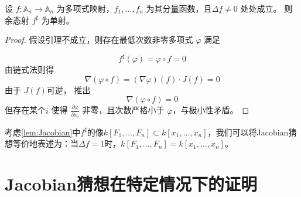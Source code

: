 \documentclass[12pt,a4paper]{ctexrep}   %
\begin{document}
\begin{lemma}
    \label{lem:Jacobian}
    设 $f: \mathbb{A}_n \to \mathbb{A}_n$ 为多项式映射，$f_1,\dots,f_n$ 为其分量函数，且$\Delta f\neq 0$   处处成立。
    则余态射 $f^\sharp$ 为单射。
\end{lemma}

\begin{proof}
    假设引理不成立，则存在最低次数非零多项式
    $\varphi$
    满足

    \begin{equation*}
        f^\sharp(\varphi)=\varphi\circ f=0
    \end{equation*}
    由链式法则得
    \begin{equation*}
        \nabla (\varphi\circ f)
        =
        (\nabla \varphi)(f)\cdot J(f)=0
    \end{equation*}
    由于 $J(f)$可逆，
    推出
    \begin{equation*}
        \nabla (\varphi\circ f)=0
    \end{equation*}
    但存在某个$i$ 使得 $\frac{\partial \varphi}{\partial x_i}$ 非零，且次数严格小于 $\varphi$，与极小性矛盾。
\end{proof}
考虑\ref{lem:Jacobian}中$f^{\sharp}$的像$k[F_1,\dots,F_n]\subset k[x_1,\dots,x_n]$，我们可以将Jacobian猜想等价地表述为：当$\Delta f=1$时，$k[F_1,\dots,F_n]=k[x_1,\dots,x_n]$。

\section{Jacobian猜想在特定情况下的证明}
\end{document}
